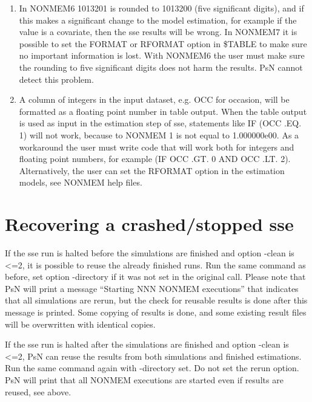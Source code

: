 \begin{enumerate}
	\item In NONMEM6 1013201 is rounded to 1013200 (five significant digits), and if this makes a significant change to the model estimation, for example if the value is a covariate, then the sse results will be wrong. In NONMEM7 it is possible to set the FORMAT or RFORMAT option in \$TABLE to make sure no important information is lost. With NONMEM6 the user must make sure the rounding to five significant digits does not harm the results. PsN cannot detect this problem.

	\item A column of integers in the input dataset, e.g. OCC for occasion, will be formatted as a floating point number in table output. When the table output is used as input in the estimation step of sse, statements like IF (OCC .EQ. 1) will not work, because to NONMEM 1 is not equal to 1.000000e00. As a workaround the user must write code that will work both for integers and floating point numbers, for example (IF OCC .GT. 0 AND OCC .LT. 2). Alternatively, the user can set the RFORMAT option in the estimation models, see NONMEM help files. 
\end{enumerate}

\section{Recovering a crashed/stopped sse}
If the sse run is halted before the simulations are finished and option -clean is <=2, 
it is possible to reuse the already finished runs. Run the same command as before, set option -directory if it was not set in the original call. Please note that PsN will print a message “Starting NNN NONMEM executions” that indicates that all simulations are rerun, but the check for reusable results is done after this message is printed. Some copying of results is done, and some existing result files will be overwritten with identical copies. 

If the sse run is halted after the simulations are finished and option -clean is <=2, 
PsN can reuse the results from both simulations and finished estimations. Run the same command again with -directory set. Do not set the rerun option. PsN will print that all NONMEM executions are started even if results are reused, see above. 


